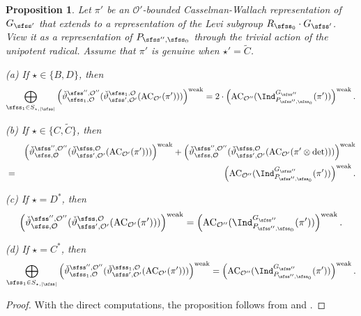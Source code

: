 \documentclass[11pt,a4paper]{amsart}
\def\abs#1{\left|{#1}\right|}
\newcommand{\CO}{{\mathcal {O}}}
\numberwithin{equation}{section}
\newtheorem{prop}[thm]{Proposition}
\theoremstyle{remark}
\begin{document}
\begin{prop}\label{prpaseq}
 Let $\pi'$ be an $\CO'$-bounded Casselman-Wallach representation of $G_{\sfss'}$ that extends to a representation of  the Levi subgroup $R_{\sfss_0}\cdot G_{\sfss'}$. View it  as a representation of $P_{\sfss'',\sfss_0}$ through the trivial action of the unipotent radical.
Assume that $\pi'$ is genuine when $\star'=\widetilde C$.

\noindent
(a) If $ \star\in \{B,D\}$,  then
\[
    \bigoplus_{\sfss_1\in S_{\star, \abs{\sfss}}}  \left(\check \vartheta^{\sfss'', \CO''}_{\sfss_1, \CO}(\check \vartheta^{\sfss_1, \CO}_{\sfss',\CO'}(\mathrm{AC}_{\CO'}(\pi')))\right)^{\mathrm{weak}}=2\cdot \left( \mathrm{AC}_{\CO''}(\Ind_{P_{\sfss'',\sfss_0}}^{G_{\sfss''}} (\pi'))\right)^{\mathrm{weak}}.
        \]

  \smallskip


    \noindent
(b) If $\star \in \{C, \widetilde C\}$, then
\begin{eqnarray*}
   && \left(\check \vartheta^{\sfss'', \CO''}_{\sfss, \CO}(\check \vartheta^{\sfss, \CO}_{\sfss',\CO'}(\mathrm{AC}_{\CO'}(\pi')))\right)^{\mathrm{weak}} +  \left(\check \vartheta^{\sfss'', \CO''}_{\sfss, \CO}(\check \vartheta^{\sfss, \CO}_{\sfss',\CO'}(\mathrm{AC}_{\CO'}(\pi'\otimes \det )))\right)^{\mathrm{weak}}\\
   & =&\left( \mathrm{AC}_{\CO''}(\Ind_{P_{\sfss'',\sfss_0}}^{G_{\sfss''}} (\pi'))\right)^{\mathrm{weak}}.
\end{eqnarray*}
  \smallskip

\noindent
(c) If $\star=D^*$, then
\[
 \left(\check \vartheta^{\sfss'', \CO''}_{\sfss, \CO}(\check \vartheta^{\sfss, \CO}_{\sfss',\CO'}(\mathrm{AC}_{\CO'}(\pi')))\right)^{\mathrm{weak}} = \left( \mathrm{AC}_{\CO''}(\Ind_{P_{\sfss'',\sfss_0}}^{G_{\sfss''}} (\pi'))\right)^{\mathrm{weak}}.
 \]

\smallskip

\noindent
(d) If $\star=C^*$, then
\[
  \bigoplus_{\sfss_1\in S_{\star, \abs{\sfss}} } \left(\check \vartheta^{\sfss'', \CO''}_{\sfss_1, \CO}(\check \vartheta^{\sfss_1, \CO}_{\sfss',\CO'}(\mathrm{AC}_{\CO'}(\pi')))\right)^{\mathrm{weak}}=\left( \mathrm{AC}_{\CO''}(\Ind_{P_{\sfss'',\sfss_0}}^{G_{\sfss''}} (\pi'))\right)^{\mathrm{weak}}.
\]
\end{prop}
\begin{proof}
  With the direct computations, the proposition follows from  and  .
\end{proof}
\end{document}
